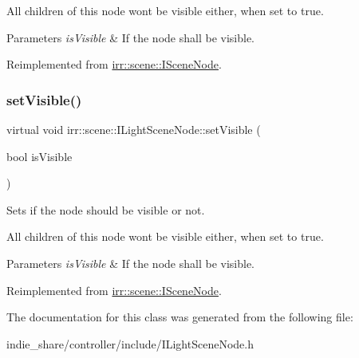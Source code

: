 All children of this node won\textquotesingle{}t be visible either, when set to true. 
\begin{DoxyParams}{Parameters}
{\em is\+Visible} & If the node shall be visible. \\
\hline
\end{DoxyParams}


Reimplemented from \hyperlink{classirr_1_1scene_1_1ISceneNode_a2e3a88fe87d11caa7986a203afe6838c}{irr\+::scene\+::\+I\+Scene\+Node}.

\mbox{\label{classirr_1_1scene_1_1ILightSceneNode_a3a6a6681a665ec4c214cda8a84a29337}} 
\subsubsection{\texorpdfstring{set\+Visible()}{setVisible()}\hspace{0.1cm}{\footnotesize\ttfamily [2/2]}}
{\footnotesize\ttfamily virtual void irr\+::scene\+::\+I\+Light\+Scene\+Node\+::set\+Visible (\begin{DoxyParamCaption}\item[{bool}]{is\+Visible }\end{DoxyParamCaption})\hspace{0.3cm}{\ttfamily [pure virtual]}}



Sets if the node should be visible or not. 

All children of this node won\textquotesingle{}t be visible either, when set to true. 
\begin{DoxyParams}{Parameters}
{\em is\+Visible} & If the node shall be visible. \\
\hline
\end{DoxyParams}


Reimplemented from \hyperlink{classirr_1_1scene_1_1ISceneNode_a2e3a88fe87d11caa7986a203afe6838c}{irr\+::scene\+::\+I\+Scene\+Node}.



The documentation for this class was generated from the following file\+:\begin{DoxyCompactItemize}
\item 
indie\+\_\+share/controller/include/I\+Light\+Scene\+Node.\+h\end{DoxyCompactItemize}
